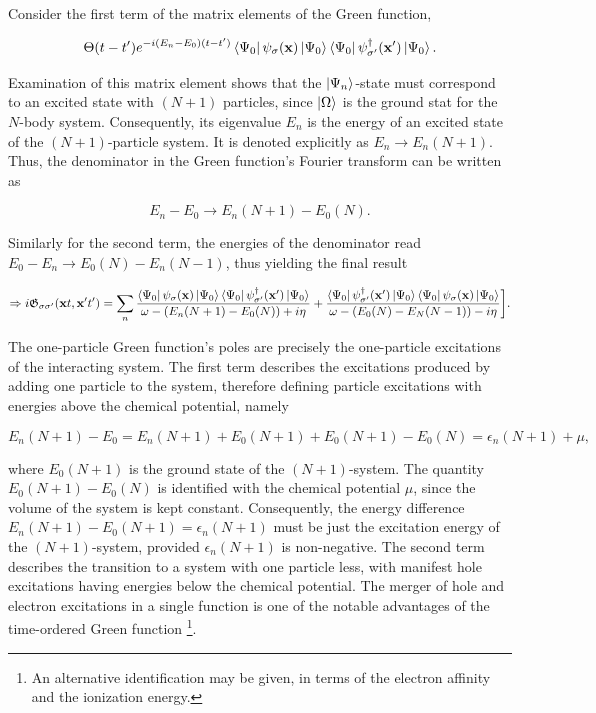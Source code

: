 Consider the first term of the matrix elements of the Green function, 

$$
\Theta(t-t') e^{-i(E_n - E_0)(t-t')} \bra{\Psi_0} \psi_{\sigma}({\bf x}) \ket{\Psi_0} \bra{\Psi_0} \psi_{\sigma'}^\dagger({\bf x}') \ket{\Psi_0}.
$$

Examination of this matrix element shows that the $\ket{\Psi_n}$-state must correspond to an excited state with $(N+1)$ particles, since $\ket{\Omega}$ is the ground stat for the $N$-body system. Consequently, its eigenvalue $E_n$ is the energy of an excited state of the $(N+1)$-particle system. It is denoted explicitly as $E_n \rightarrow E_{n}(N+1)$. Thus, the denominator in the Green function's Fourier transform can be written as 

$$
    E_n - E_0 \rightarrow E_n(N+1) - E_0(N).
$$

Similarly for the second term, the energies of the denominator read $E_0 - E_n \rightarrow E_0(N) - E_n(N-1)$, thus yielding the final result 

\begin{equation}
    \Rightarrow i \mathfrak{G}_{\sigma \sigma'} ({\bf x}t, {\bf x}'t') = \sum_{n}
             \frac{\bra{\Psi_0} \psi_{\sigma}({\bf x}) \ket{\Psi_0} \bra{\Psi_0} \psi_{\sigma'}^\dagger({\bf x}') \ket{\Psi_0}}{\omega - (E_n(N+1)-E_0(N)) + i\eta} + \frac{\bra{\Psi_0} \psi_{\sigma'}^\dagger({\bf x}')\ket{\Psi_0} \bra{\Psi_0} \psi_{\sigma}({\bf x}) \ket{\Psi_0}}{\omega - (E_0(N)-E_N(N-1)) - i\eta}\bigg].
\end{equation}

The one-particle Green function's poles are precisely the one-particle excitations of the interacting system. The first term describes the excitations produced by adding one particle to the system, therefore defining particle excitations with energies above the chemical potential, namely 

$$
E_n (N+1) - E_0 = E_n (N+1) + E_0(N+1) + E_0(N+1) - E_0(N) = \epsilon_n (N+1) + \mu,
$$

where $E_0(N+1)$ is the ground state of the $(N+1)$-system. The quantity $E_0(N+1) - E_0(N)$ is identified with the chemical potential $\mu$, since the volume of the system is kept constant. Consequently, the energy difference $E_n(N+1) - E_0(N+1) = \epsilon_n (N+1)$ must be just the excitation energy of the $(N+1)$-system, provided $\epsilon_n (N+1)$ is non-negative. The second term describes the transition to a system with one particle less, with manifest hole excitations having energies below the chemical potential. The merger of hole and electron excitations in a single function is one of the notable advantages of the time-ordered Green function \footnote{An alternative identification may be given, in terms of the electron affinity and the ionization energy.}. \\

